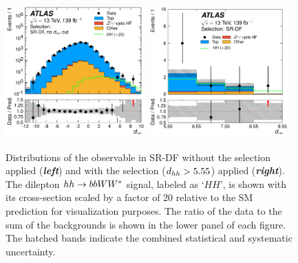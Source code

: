 \begin{figure}[!htb]
    \begin{center}
        \includegraphics[width=0.48\textwidth]{figures/search_hh/results/sr_plots/srDFNoDhh_NN_d_hh}
        \includegraphics[width=0.48\textwidth]{figures/search_hh/results/sr_plots/srDFNoDhhCloseCut_NN_d_hh}
        \caption{
            Distributions of the \dhh observable in SR-DF without the \dhh selection applied (\textit{\textbf{left}})
            and with the \dhh selection ($ d_{hh} > 5.55$) applied (\textit{\textbf{right}}).
            The dilepton $hh \rightarrow bbWW^*$ signal, labeled as `$HH$', is shown with its cross-section scaled
            by a factor of 20 relative to the SM prediction for visualization purposes.
            The ratio of the data to the sum of the backgrounds is shown in the lower panel of each figure.
            The hatched bands indicate the combined statistical and systematic uncertainty.
        }
        \label{fig:hh_sr_kin_1}
    \end{center}
\end{figure}

